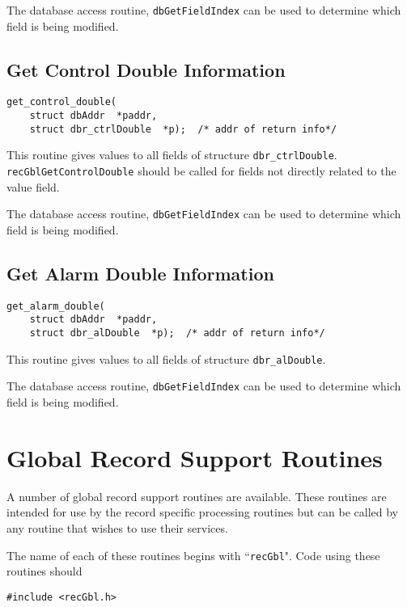 The database access routine, \verb|dbGetFieldIndex| can be used to determine which field is being modified.

\subsection{Get Control Double Information}

\begin{verbatim}
get_control_double(
    struct dbAddr  *paddr,
    struct dbr_ctrlDouble  *p);  /* addr of return info*/
\end{verbatim}

This routine gives values to all fields of structure \verb|dbr_ctrlDouble|.
\verb|recGblGetControlDouble| should be called for fields not directly related to the value field.

The database access routine, \verb|dbGetFieldIndex| can be used to determine which field is being modified.

\subsection{Get Alarm Double Information}

\begin{verbatim}
get_alarm_double(
    struct dbAddr  *paddr,
    struct dbr_alDouble  *p);  /* addr of return info*/
\end{verbatim}

This routine gives values to all fields of structure \verb|dbr_alDouble|.

The database access routine, \verb|dbGetFieldIndex| can be used to determine which field is being modified.

\section{Global Record Support Routines}

A number of global record support routines are available.
These routines are intended for use by the record specific processing routines but can be called by any routine that wishes to use their services.

The name of each of these routines begins with ``\verb|recGbl|".
Code using these routines should
\begin{verbatim}
#include <recGbl.h>
\end{verbatim}

